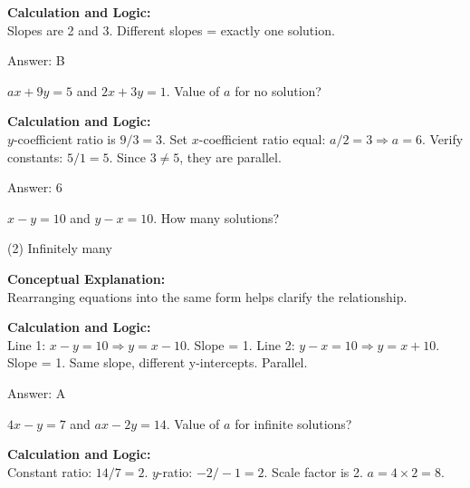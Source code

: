 \documentclass[11pt,paper=a4,answers]{exam}
\begin{document}
\begin{questions}
\begin{solution}
\textbf{Calculation and Logic:} \\
Slopes are 2 and 3. Different slopes = exactly one solution.

\vspace{15pt}
Answer: \colorbox{yellow!100}{B}
\end{solution}

\question
$ax + 9y = 5$ and $2x + 3y = 1$. Value of $a$ for no solution?

\begin{solution}
\textbf{Calculation and Logic:} \\
$y$-coefficient ratio is $9/3 = 3$.
Set $x$-coefficient ratio equal: $a/2 = 3 \Rightarrow a = 6$.
Verify constants: $5/1 = 5$. Since $3 \neq 5$, they are parallel.

\vspace{15pt}
Answer: \colorbox{yellow!100}{6}
\end{solution}

\question
$x - y = 10$ and $y - x = 10$. How many solutions?
\begin{tasks}(2)
    \task Infinitely many
\end{tasks}

\begin{solution}
\textbf{Conceptual Explanation:} \\
Rearranging equations into the same form helps clarify the relationship.

\vspace{10pt}
\textbf{Calculation and Logic:} \\
Line 1: $x - y = 10 \Rightarrow y = x - 10$. Slope = 1.
Line 2: $y - x = 10 \Rightarrow y = x + 10$. Slope = 1.
Same slope, different y-intercepts. Parallel.

\vspace{15pt}
Answer: \colorbox{yellow!100}{A}
\end{solution}

\question
$4x - y = 7$ and $ax - 2y = 14$. Value of $a$ for infinite solutions?

\begin{solution}
\textbf{Calculation and Logic:} \\
Constant ratio: $14/7 = 2$.
$y$-ratio: $-2 / -1 = 2$.
Scale factor is 2.
$a = 4 \times 2 = 8$.


\end{solution}
\end{questions}
\end{document}
